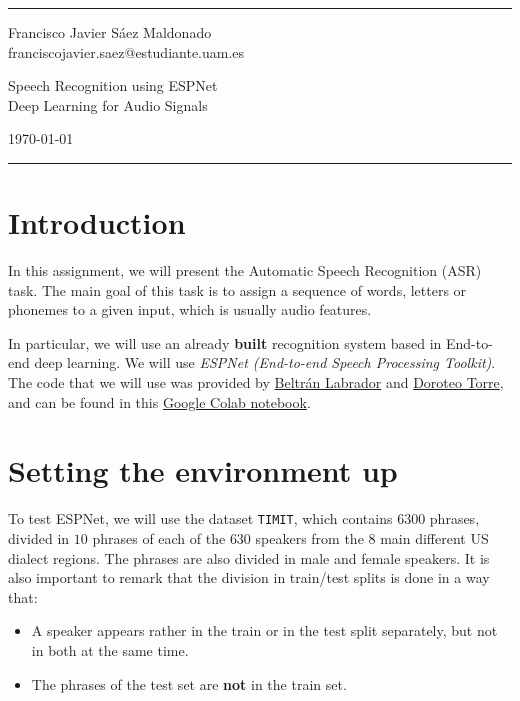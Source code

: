 \documentclass[a4paper]{article}
\def\inline{\lstinline[basicstyle=\ttfamily,keywordstyle={}]}
\begin{document}

\fancyhead[C]{}
\hrule \medskip %
\begin{minipage}{0.295\textwidth}
  \raggedright
  \footnotesize
  Francisco Javier Sáez Maldonado \hfill\\
  franciscojavier.saez@estudiante.uam.es
  \hfill\\
\end{minipage}
\begin{minipage}{0.4\textwidth}
  \centering
  \large
  Speech Recognition using ESPNet\\

  \normalsize
  Deep Learning for Audio Signals\\
\end{minipage}
\begin{minipage}{0.295\textwidth}
  \raggedleft
  \today\hfill\\
\end{minipage}
\medskip\hrule


\tableofcontents

\section*{Introduction}

In this assignment, we will present the Automatic Speech Recognition (ASR) task. The main goal of this task is to assign a sequence of words, letters or phonemes to a given input, which is usually audio features.

In particular, we will use an already \textbf{built} recognition system based in End-to-end deep learning. We will use \emph{ESPNet (End-to-end Speech Processing Toolkit)}. The code that we will use was provided by \href{https://scholar.google.com/citations?user=biA-c9sAAAAJ&hl=en}{Beltrán Labrador} and \href{https://scholar.google.es/citations?user=aENoFF4AAAAJ&hl=es}{Doroteo Torre}, and can be found in this \href{https://colab.research.google.com/drive/17JDlDB2ERa4YQAtKIaWfQysygPs7ao8W?usp=sharing}{Google Colab notebook}.

\section{Setting the environment up}

To test ESPNet, we will use the dataset \inline{TIMIT}, which contains \(6300\) phrases, divided in \(10\) phrases of each of the \(630\) speakers from the \(8\) main different US dialect regions. The phrases are also divided in male and female speakers. It is also important to remark that the division in train/test splits is done in a way that:
\begin{itemize}
  \item A speaker appears rather in the train or in the test split separately, but not in both at the same time.
  \item The phrases of the test set are \textbf{not} in the train set.
\end{itemize}
\end{document}
